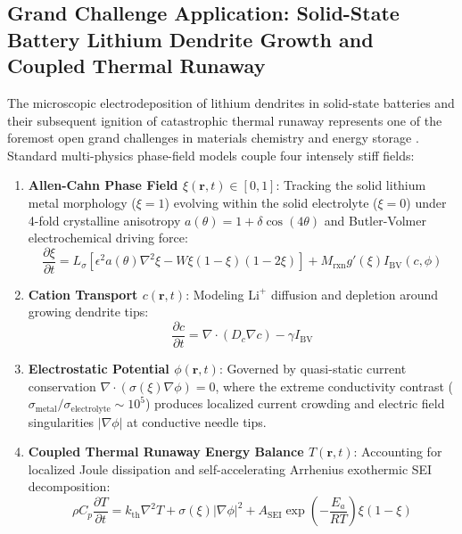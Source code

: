 \documentclass[11pt,a4paper]{article}
\theoremstyle{plain}
\theoremstyle{definition}
\begin{document}
\subsection{Grand Challenge Application: Solid-State Battery Lithium Dendrite Growth and Coupled Thermal Runaway}
The microscopic electrodeposition of lithium dendrites in solid-state batteries and their subsequent ignition of catastrophic thermal runaway represents one of the foremost open grand challenges in materials chemistry and energy storage \cite{goodenough2013, chen2021phase}. Standard multi-physics phase-field models couple four intensely stiff fields:
\begin{enumerate}
    \item \textbf{Allen-Cahn Phase Field $\xi(\mathbf{r}, t) \in [0, 1]$}: Tracking the solid lithium metal morphology ($\xi = 1$) evolving within the solid electrolyte ($\xi = 0$) under 4-fold crystalline anisotropy $a(\theta) = 1 + \delta \cos(4\theta)$ and Butler-Volmer electrochemical driving force:
    \begin{equation}
    \frac{\partial \xi}{\partial t} = L_\sigma \left[ \epsilon^2 a(\theta) \nabla^2 \xi - W \xi(1-\xi)(1-2\xi) \right] + M_{\text{rxn}} g'(\xi) I_{\text{BV}}(c, \phi)
    \end{equation}
    \item \textbf{Cation Transport $c(\mathbf{r}, t)$}: Modeling $\text{Li}^+$ diffusion and depletion around growing dendrite tips:
    \begin{equation}
    \frac{\partial c}{\partial t} = \nabla \cdot (D_c \nabla c) - \gamma I_{\text{BV}}
    \end{equation}
    \item \textbf{Electrostatic Potential $\phi(\mathbf{r}, t)$}: Governed by quasi-static current conservation $\nabla \cdot (\sigma(\xi) \nabla \phi) = 0$, where the extreme conductivity contrast ($\sigma_{\text{metal}} / \sigma_{\text{electrolyte}} \sim 10^5$) produces localized current crowding and electric field singularities $|\nabla \phi|$ at conductive needle tips.
    \item \textbf{Coupled Thermal Runaway Energy Balance $T(\mathbf{r}, t)$}: Accounting for localized Joule dissipation and self-accelerating Arrhenius exothermic SEI decomposition:
    \begin{equation}
    \rho C_p \frac{\partial T}{\partial t} = k_{\text{th}} \nabla^2 T + \sigma(\xi) |\nabla \phi|^2 + A_{\text{SEI}} \exp\left(-\frac{E_a}{R T}\right) \xi (1 - \xi)
    \end{equation}
\end{enumerate}
\end{document}
